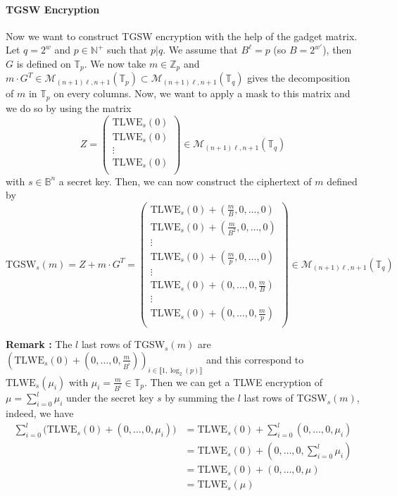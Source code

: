 \documentclass{article}
\newcommand{\Z}{\mathbb{Z}}
\newcommand{\N}{\mathbb{N}}
\newcommand{\T}{\mathbb{T}}
\newcommand{\B}{\mathbb{B}}
\theoremstyle{definition}
\theoremstyle{Theorem}
\begin{document}

\paragraph{TGSW Encryption}
Now we want to construct TGSW encryption with the help of the gadget matrix. Let $q=2^w$ and $p\in\N^+$ such that $p|q$. We assume that $B^\ell=p$ (so $B=2^{w'}$), then $G$ is defined on $\T_p$. We now take $m\in\Z_p$ and $m\cdot G^T \in \mathcal{M}_{(n+1)\ell,n+1}(\T_p) \subset \mathcal{M}_{(n+1)\ell,n+1}(\T_q)$ gives the decomposition of $m$ in $\T_p$ on every columns. Now, we want to apply a mask to this matrix and we do so by using the matrix
$$
Z = \begin{pmatrix}
    \text{TLWE}_s(0)\\
    \text{TLWE}_s(0)\\
    \vdots\\
    \text{TLWE}_s(0)\\
    \end{pmatrix} \in \mathcal{M}_{(n+1)\ell,n+1}(\T_q)
$$
with $s\in \B^{n}$ a secret key. Then, we can now construct the ciphertext of $m$ defined by 
$$
\text{TGSW}_s(m)= Z + m\cdot G^T =  \begin{pmatrix}
    \text{TLWE}_s(0) + (\frac{m}{B},0,\ldots,0)\\
    \text{TLWE}_s(0)+ (\frac{m}{B^2},0,\ldots,0)\\
    \vdots\\
    \text{TLWE}_s(0)+ (\frac{m}{p},0,\ldots,0)\\
    \vdots\\
    \text{TLWE}_s(0)+ (0,\ldots,0,\frac{m}{B})\\
    \vdots\\
    \text{TLWE}_s(0) + (0,\ldots,0,\frac{m}{p})\\
    \end{pmatrix} \in \mathcal{M}_{(n+1)\ell,n+1}(\T_q)
$$

\textbf{Remark :} The $l$ last rows of TGSW$_s(m)$ are $(\text{TLWE}_s(0) + (0,\ldots,0,\frac{m}{B^i}))_{i\in\llbracket 1,\log_2(p)\rrbracket}$ and this correspond to $\text{TLWE}_s(\mu_i)$ with $\mu_i=\frac{m}{B^i} \in \T_p$. Then we can get a TLWE encryption of $\mu=\sum_{i=0}^{l}\mu_i$ under the secret key $s$ by summing the $l$ last rows of TGSW$_s(m)$, indeed, we have 
\begin{equation}
\begin{split}
    \sum_{i=0}^{l} \big(\text{TLWE}_s(0) + (0,\ldots,0,\mu_i)\big) &= \text{TLWE}_s(0) + \sum_{i=0}^{l}(0,\ldots,0,\mu_i)\\
    &= \text{TLWE}_s(0) + (0,\ldots,0,\sum_{i=0}^{l}\mu_i)\\
    &= \text{TLWE}_s(0) + (0,\ldots,0,\mu)\\
    &= \text{TLWE}_s(\mu)
\end{split}
\end{equation}
\end{document}
